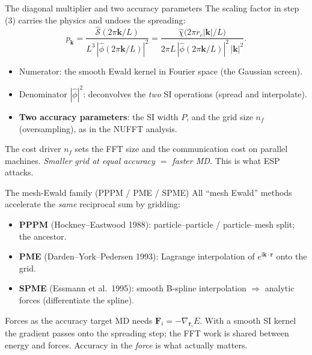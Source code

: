 \documentclass[aspectratio=169,11pt]{beamer}
\newcommand{\ii}{\mathrm i}
\newcommand{\kk}{\bm{k}}
\newcommand{\rr}{\bm{r}}
\newcommand{\hl}[1]{{\color{CCMorange}\textbf{#1}}}
\newcommand{\gray}[1]{{\color{mygray}#1}}
\begin{document}
\begin{frame}{The diagonal multiplier and two accuracy parameters}
\small
The scaling factor in step (3) carries the physics and undoes the spreading:
\[
  p_{\kk}=\frac{\widehat{\mathcal S}(2\pi\kk/L)}{L^3\,|\widehat\phi(2\pi\kk/L)|^2}
        =\frac{\widehat\chi\!\big(2\pi r_c|\kk|/L\big)}{2\pi L\,|\widehat\phi(2\pi\kk/L)|^2\,|\kk|^2}.
\]
\begin{itemize}
  \item Numerator: the smooth Ewald kernel in Fourier space (the Gaussian screen).
  \item Denominator \(|\widehat\phi|^2\): deconvolves the \emph{two} SI operations (spread and interpolate).
  \item \hl{Two accuracy parameters}: the SI width \(P\), and the grid size \(n_f\)
  (oversampling), as in the NUFFT analysis.
\end{itemize}
\begin{block}{The cost driver}
\(n_f\) sets the FFT size and the communication cost on parallel machines. \emph{Smaller grid at equal accuracy \(=\) faster MD.} This is what ESP attacks.
\end{block}
\end{frame}

\begin{frame}{The mesh-Ewald family (PPPM / PME / SPME)}
\small
All ``mesh Ewald'' methods accelerate the \emph{same} reciprocal sum by gridding:
\begin{itemize}\itemsep2pt
  \item \hl{PPPM} \gray{(Hockney--Eastwood 1988)}: particle--particle / particle--mesh split; the ancestor.
  \item \hl{PME} \gray{(Darden--York--Pedersen 1993)}: Lagrange interpolation of \(e^{\ii\kk\cdot\rr}\) onto the grid.
  \item \hl{SPME} \gray{(Essmann et al.\ 1995)}: smooth B-spline interpolation \(\Rightarrow\) analytic forces (differentiate the spline).
\end{itemize}
\vspace{1mm}
\begin{block}{Forces as the accuracy target}
MD needs \(\bm F_i=-\nabla_{\rr_i}E\). With a smooth SI kernel the gradient passes onto the spreading step; the FFT work is shared between energy and forces. Accuracy in the \emph{force} is what actually matters.
\end{block}
\end{frame}
\end{document}
